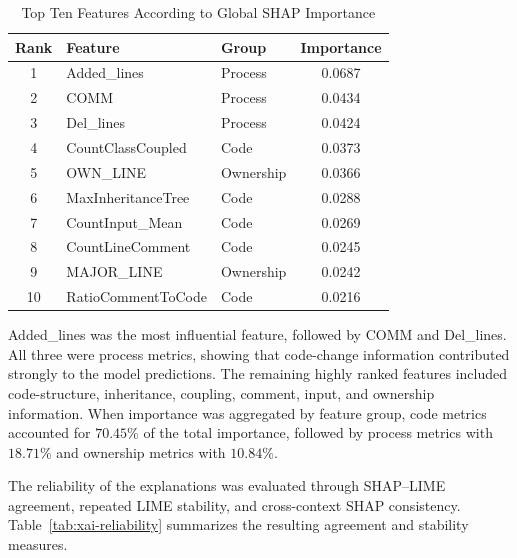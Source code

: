 \documentclass[conference]{IEEEtran}
\begin{document}
\begin{table}[H]
\caption{Top Ten Features According to Global SHAP Importance}
\label{tab:global-shap-features}
\centering
\setlength{\tabcolsep}{5pt}
\begin{tabular}{cllc}
\hline
\textbf{Rank} & \textbf{Feature} & \textbf{Group} &
\textbf{Importance} \\
\hline
1  & Added\_lines          & Process   & 0.0687 \\
2  & COMM                  & Process   & 0.0434 \\
3  & Del\_lines            & Process   & 0.0424 \\
4  & CountClassCoupled     & Code      & 0.0373 \\
5  & OWN\_LINE             & Ownership & 0.0366 \\
6  & MaxInheritanceTree    & Code      & 0.0288 \\
7  & CountInput\_Mean      & Code      & 0.0269 \\
8  & CountLineComment      & Code      & 0.0245 \\
9  & MAJOR\_LINE           & Ownership & 0.0242 \\
10 & RatioCommentToCode    & Code      & 0.0216 \\
\hline
\end{tabular}
\end{table}

Added\_lines was the most influential feature, followed by COMM and
Del\_lines. All three were process metrics, showing that code-change
information contributed strongly to the model predictions. The
remaining highly ranked features included code-structure,
inheritance, coupling, comment, input, and ownership information.
When importance was aggregated by feature group, code metrics
accounted for \(70.45\%\) of the total importance, followed by process
metrics with \(18.71\%\) and ownership metrics with \(10.84\%\).

The reliability of the explanations was evaluated through SHAP--LIME
agreement, repeated LIME stability, and cross-context SHAP
consistency. Table~\ref{tab:xai-reliability} summarizes the resulting
agreement and stability measures.
\end{document}
